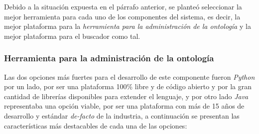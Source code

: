 Debido a la situación expuesta en el párrafo anterior, se planteó seleccionar la mejor herramienta para cada uno de los componentes del sistema, es decir, la mejor plataforma para la \textit{herramienta para la administración de la ontología} y la mejor plataforma para el buscador como tal.

\subsubsection{Herramienta para la administración de la ontología}
Las dos opciones más fuertes para el desarrollo de este componente fueron \textit{Python} por un lado, por ser una plataforma 100\% libre y de código abierto y por la gran cantidad de librerías disponibles para extender el lenguaje, y por otro lado \textit{Java} representaba una opción viable, por ser una plataforma con más de 15 años de desarrollo y estándar \textit{de-facto} de la industria, a continuación se presentan las características más destacables de cada una de las opciones:


